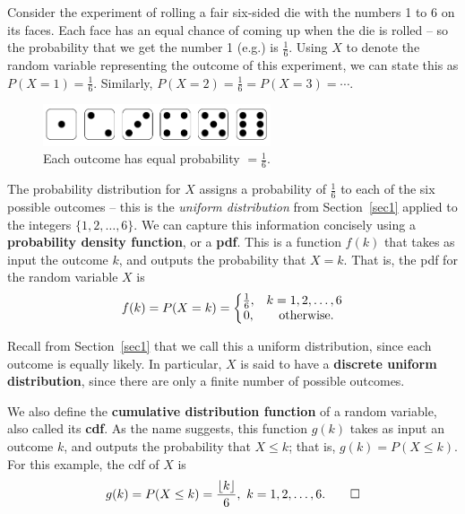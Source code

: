\begin{myexample}\label{2_dice_example}
Consider the experiment of rolling a fair six-sided die with the numbers 1 to 6 on its faces.
Each face has an equal chance of coming up when the die is rolled -- so the probability that we get the number 1 (e.g.) is $\frac{1}{6}$.
Using $X$ to denote the random variable representing the outcome of this experiment, we can state this as $P(X = 1) = \frac{1}{6}$. Similarly, $P(X = 2) = \frac{1}{6} = P(X = 3) = \cdots$.

\begin{figure}[htbp]
	\centering
	\includegraphics[width=0.6\textwidth]{fig/2_dice_example.png}
	\caption{Each outcome has equal probability $= \frac{1}{6}$. \label{fig:2_dice_example}}
\end{figure}


The probability distribution for $X$ assigns a probability of $\frac{1}{6}$ to each of the six possible outcomes -- this is the \emph{uniform distribution} from Section~\ref{sec1} applied to the integers $\{1,2,\ldots,6\}$. 
We can capture this information concisely using a \textbf{probability density function}, or a \textbf{pdf}.
This is a function $f(k)$ that takes as input the outcome $k$, and outputs the probability that $X = k$.
That is, the pdf for the random variable $X$ is \[ f(k) = P(X = k) = \left\{ \begin{matrix} \frac{1}{6}, & k = 1,2,\ldots, 6 \cr 0, & \text{ otherwise.} \end{matrix} \right. \]


Recall from Section~\ref{sec1} that we call this a uniform distribution, since each outcome is equally likely.
In particular, $X$ is said to have a \textbf{discrete uniform distribution}, since there are only a finite number of possible outcomes.

We also define the \textbf{cumulative distribution function} of a random variable, also called its \textbf{cdf}.
As the name suggests, this function $g(k)$ takes as input an outcome $k$, and outputs the probability that $X \leq k$; that is, $g(k) = P(X \leq k)$.
For this example, the cdf of $X$ is \[ g(k) = P(X \leq k) = \frac{\lfloor k \rfloor}{6}, \ k = 1,2,\ldots,6. \qed \] 


\end{myexample}
